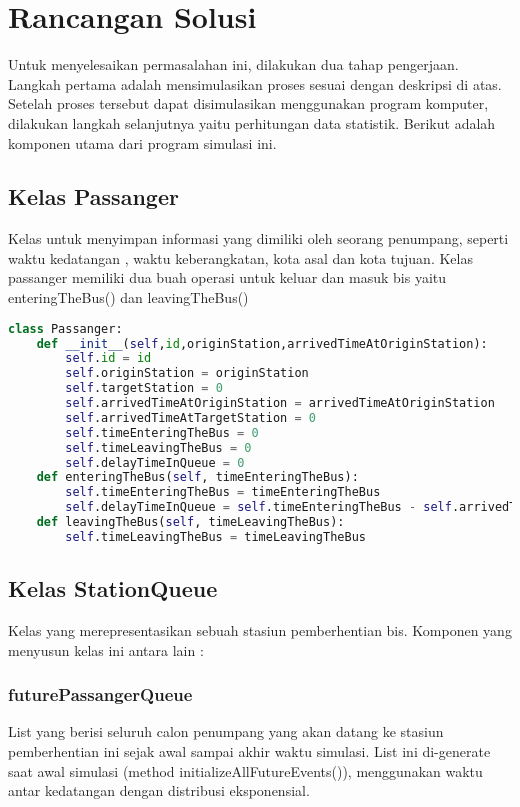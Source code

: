 \documentclass{article}
\begin{document}
	\section{Rancangan Solusi}
	Untuk menyelesaikan permasalahan ini, dilakukan dua tahap pengerjaan.
	Langkah pertama adalah mensimulasikan proses sesuai dengan deskripsi di atas. Setelah proses tersebut dapat disimulasikan menggunakan program komputer, dilakukan langkah selanjutnya yaitu perhitungan data statistik. 
	Berikut adalah komponen utama dari program simulasi ini.


	\subsection{Kelas Passanger}
	Kelas untuk menyimpan informasi yang dimiliki oleh seorang penumpang, seperti waktu kedatangan , waktu keberangkatan, kota asal dan kota tujuan. Kelas passanger memiliki dua buah operasi untuk keluar dan masuk bis yaitu enteringTheBus() dan leavingTheBus()
	\begin{lstlisting}[language=Python]
	class Passanger:
	def __init__(self,id,originStation,arrivedTimeAtOriginStation):
		self.id = id
		self.originStation = originStation
		self.targetStation = 0
		self.arrivedTimeAtOriginStation = arrivedTimeAtOriginStation
		self.arrivedTimeAtTargetStation = 0
		self.timeEnteringTheBus = 0
		self.timeLeavingTheBus = 0
		self.delayTimeInQueue = 0
	def enteringTheBus(self, timeEnteringTheBus):
		self.timeEnteringTheBus = timeEnteringTheBus
		self.delayTimeInQueue = self.timeEnteringTheBus - self.arrivedTimeAtOriginStation
	def leavingTheBus(self, timeLeavingTheBus):
		self.timeLeavingTheBus = timeLeavingTheBus
	\end{lstlisting}


	\pagebreak

	\subsection{Kelas StationQueue}
	Kelas yang merepresentasikan sebuah stasiun pemberhentian bis. Komponen yang menyusun kelas ini antara lain :

\subsubsection{futurePassangerQueue}
List yang berisi seluruh calon penumpang yang akan datang ke stasiun pemberhentian ini sejak awal sampai akhir waktu simulasi. List ini di-generate saat awal simulasi (method initializeAllFutureEvents()), menggunakan waktu antar kedatangan dengan distribusi eksponensial.
\end{document}
